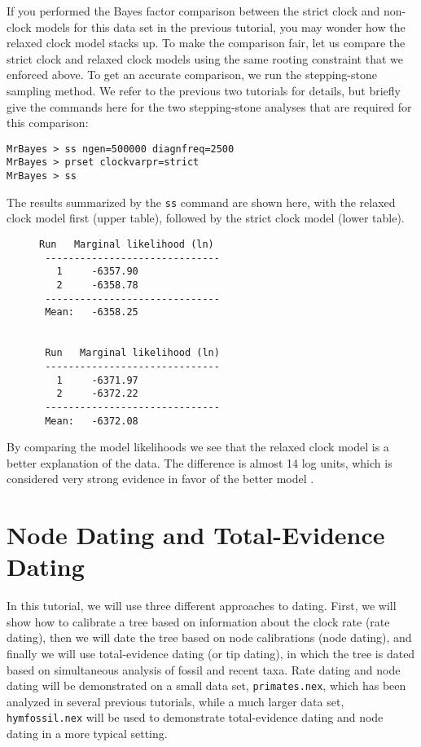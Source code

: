 \documentclass[12pt]{book}
\begin{document}
If you performed the Bayes factor comparison between the strict clock and non-clock models for this
data set in the previous tutorial, you may wonder how the relaxed clock model stacks up. To make
the comparison fair, let us compare the strict clock and relaxed clock models using the same
rooting constraint that we enforced above. To get an accurate comparison, we run the stepping-stone
sampling method. We refer to the previous two tutorials for details, but briefly give the commands
here for the two stepping-stone analyses that are required for this comparison:

\begin{Verbatim}
MrBayes > ss ngen=500000 diagnfreq=2500
MrBayes > prset clockvarpr=strict
MrBayes > ss
\end{Verbatim}

The results summarized by the \texttt{ss} command are shown here, with the relaxed clock model
first (upper table), followed by the strict clock model (lower table).

\begin{figure}[h]
\centering
\begin{BVerbatim}
Run   Marginal likelihood (ln)
 ------------------------------
   1     -6357.90
   2     -6358.78
 ------------------------------
 Mean:   -6358.25


 Run   Marginal likelihood (ln)
 ------------------------------
   1     -6371.97
   2     -6372.22
 ------------------------------
 Mean:   -6372.08
\end{BVerbatim}
\end{figure}

By comparing the model likelihoods we see that the relaxed clock model is a better explanation of
the data. The difference is almost 14 log units, which is considered very strong evidence in favor
of the better model \citep{kass95}.

\section{Node Dating and Total-Evidence Dating}

In this tutorial, we will use three different approaches to dating. First, we will show how to
calibrate a tree based on information about the clock rate (rate dating), then we will date the
tree based on node calibrations (node dating), and finally we will use total-evidence dating (or
tip dating), in which the tree is dated based on simultaneous analysis of fossil and recent taxa.
Rate dating and node dating will be demonstrated on a small data set, \texttt{primates.nex}, which
has been analyzed in several previous tutorials, while a much larger data set,
\texttt{hymfossil.nex} will be used to demonstrate total-evidence dating and node dating in a more
typical setting.
\end{document}
